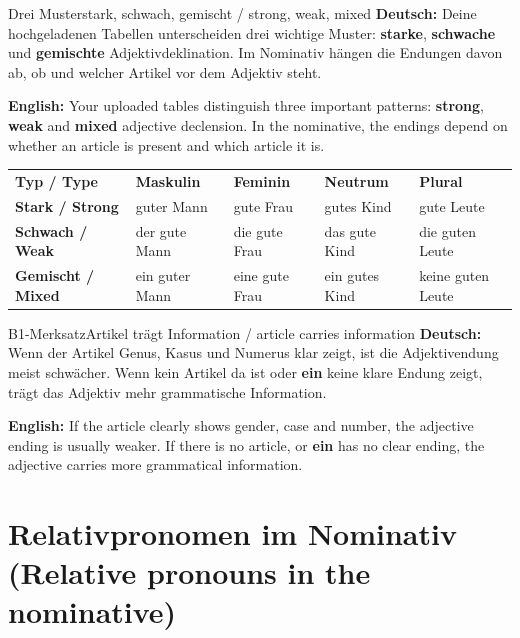 \documentclass[a4paper,11pt]{article}
\newcommand{\GermanText}[1]{\textbf{Deutsch: }#1\par}
\newcommand{\EnglishText}[1]{{\small\color{SoftGray}\textbf{English: }#1\par}}
\begin{document}
\begin{grammarentry}{Drei Muster}{stark, schwach, gemischt / strong, weak, mixed}
\GermanText{Deine hochgeladenen Tabellen unterscheiden drei wichtige Muster: \textbf{starke}, \textbf{schwache} und \textbf{gemischte} Adjektivdeklination. Im Nominativ hängen die Endungen davon ab, ob und welcher Artikel vor dem Adjektiv steht.}
\EnglishText{Your uploaded tables distinguish three important patterns: \textbf{strong}, \textbf{weak} and \textbf{mixed} adjective declension. In the nominative, the endings depend on whether an article is present and which article it is.}
\end{grammarentry}

\begin{longtable}{>{\bfseries}p{3.5cm}|>{\raggedright\arraybackslash}p{3.2cm}>{\raggedright\arraybackslash}p{3.2cm}>{\raggedright\arraybackslash}p{3.2cm}>{\raggedright\arraybackslash}p{3.2cm}}
\rowcolor{HeaderBlueDark}
\color{white}\textbf{Typ / Type} &
\color{white}\textbf{Maskulin} &
\color{white}\textbf{Feminin} &
\color{white}\textbf{Neutrum} &
\color{white}\textbf{Plural} \\
Stark / Strong & guter Mann & gute Frau & gutes Kind & gute Leute \\
Schwach / Weak & der gute Mann & die gute Frau & das gute Kind & die guten Leute \\
Gemischt / Mixed & ein guter Mann & eine gute Frau & ein gutes Kind & keine guten Leute \\
\end{longtable}

\begin{grammarentry}{B1-Merksatz}{Artikel trägt Information / article carries information}
\GermanText{Wenn der Artikel Genus, Kasus und Numerus klar zeigt, ist die Adjektivendung meist schwächer. Wenn kein Artikel da ist oder \textbf{ein} keine klare Endung zeigt, trägt das Adjektiv mehr grammatische Information.}
\EnglishText{If the article clearly shows gender, case and number, the adjective ending is usually weaker. If there is no article, or \textbf{ein} has no clear ending, the adjective carries more grammatical information.}
\end{grammarentry}

\section{Relativpronomen im Nominativ \textnormal{(Relative pronouns in the nominative)}}
\end{document}
